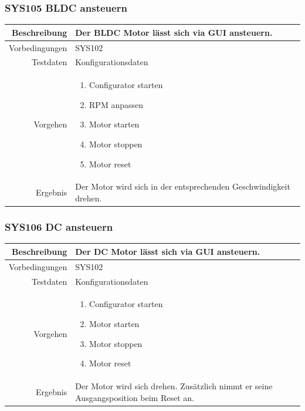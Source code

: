 \subsubsection{SYS105 BLDC ansteuern}
\begin{table}[h!]
	\renewcommand{\arraystretch}{1.5}
	\begin{tabular}{|r|p{14cm}|}
		\hline Beschreibung & Der BLDC Motor lässt sich via GUI ansteuern. \\ 
		\hline Vorbedingungen & SYS102 \\ 
		\hline Testdaten & Konfigurationsdaten \\ 
		\hline Vorgehen & 
		\begin{enumerate}
			\item Configurator starten
			\item RPM anpassen
			\item Motor starten
			\item Motor stoppen
			\item Motor reset
		\end{enumerate} \\ 
		\hline Ergebnis & Der Motor wird sich in der entsprechenden Geschwindigkeit drehen. \\ 
		\hline 
	\end{tabular}
\end{table}

\subsubsection{SYS106 DC ansteuern }
\begin{table}[h!]
	\renewcommand{\arraystretch}{1.5}
	\begin{tabular}{|r|p{14cm}|}
		\hline Beschreibung & Der DC Motor lässt sich via GUI ansteuern. \\ 
		\hline Vorbedingungen & SYS102 \\ 
		\hline Testdaten & Konfigurationsdaten \\ 
		\hline Vorgehen & 
		\begin{enumerate}
			\item Configurator starten
			\item Motor starten
			\item Motor stoppen
			\item Motor reset
		\end{enumerate} \\ 
		\hline Ergebnis & Der Motor wird sich drehen. Zusätzlich nimmt er seine Ausgangsposition beim Reset an.\\ 
		\hline 
	\end{tabular}
\end{table}

